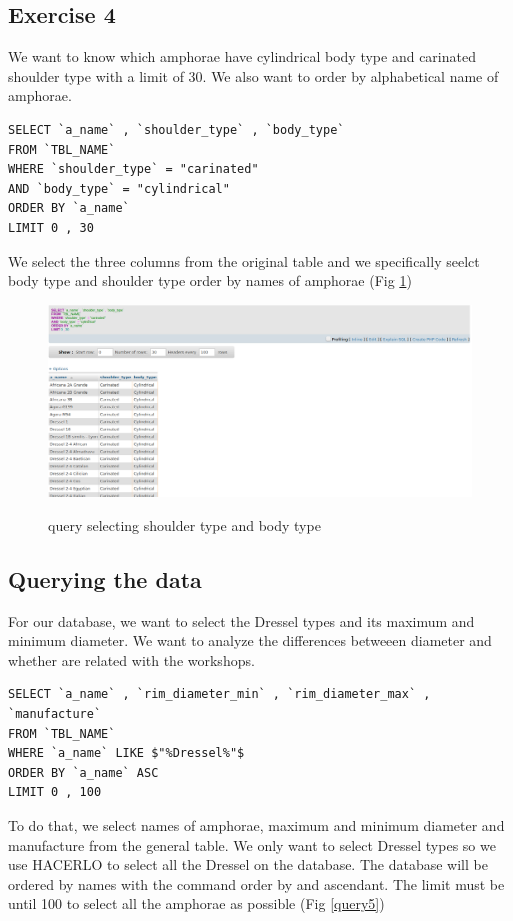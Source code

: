 \documentclass[10pt,a4paper]{article}
\begin{document}
\subsection{Exercise 4}

We want to know which amphorae have cylindrical body type and carinated shoulder type with a limit of 30. We also want to order by alphabetical name of amphorae. 

\begin{verbatim}
SELECT `a_name` , `shoulder_type` , `body_type`
FROM `TBL_NAME`
WHERE `shoulder_type` = "carinated"
AND `body_type` = "cylindrical"
ORDER BY `a_name`
LIMIT 0 , 30
\end{verbatim}

We select the three columns from the original table and we specifically seelct body type and shoulder type order by names of amphorae (Fig \ref{query4})

\begin{figure}[hdp]
\centering
\includegraphics[scale=0.30]{query4.png}
\label{query4}
\caption{query selecting shoulder type and body type}
\end{figure} 


\subsection{Querying the data}

For our database, we want to select the Dressel types and its maximum and minimum diameter. We want to analyze the differences betweeen diameter and whether are related with the workshops. 

\begin{verbatim}
SELECT `a_name` , `rim_diameter_min` , `rim_diameter_max` , `manufacture`
FROM `TBL_NAME`
WHERE `a_name` LIKE $"%Dressel%"$
ORDER BY `a_name` ASC
LIMIT 0 , 100
\end{verbatim}

To do that, we select names of amphorae, maximum and minimum diameter and manufacture from the general table. We only want to select Dressel types so we use HACERLO to select all the Dressel on the database. The database will be ordered by names with the command order by and ascendant. The limit must be until 100 to select all the amphorae as possible (Fig \ref{query5})
\end{document}
